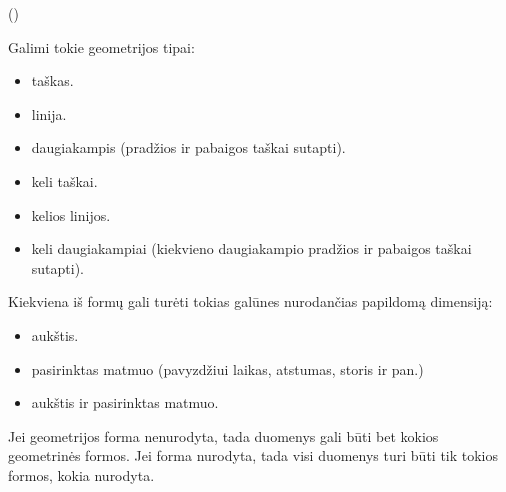 \documentclass[letterpaper,10pt,lithuanian]{sphinxmanual}
\begin{document}
\begin{fulllineitems}
\sphinxAtStartPar
{} ()

\sphinxAtStartPar
Galimi tokie geometrijos tipai:
\begin{itemize}
\item {} 
\sphinxAtStartPar
{} \sphinxhyphen{} taškas.

\item {} 
\sphinxAtStartPar
{} \sphinxhyphen{} linija.

\item {} 
\sphinxAtStartPar
{} \sphinxhyphen{} daugiakampis (pradžios ir pabaigos taškai  sutapti).

\item {} 
\sphinxAtStartPar
{} \sphinxhyphen{} keli taškai.

\item {} 
\sphinxAtStartPar
{} \sphinxhyphen{} kelios linijos.

\item {} 
\sphinxAtStartPar
{} \sphinxhyphen{} keli daugiakampiai (kiekvieno daugiakampio pradžios ir pabaigos taškai  sutapti).

\end{itemize}

\sphinxAtStartPar
Kiekviena iš formų gali turėti tokias galūnes nurodančias papildomą dimensiją:
\begin{itemize}
\item {} 
\sphinxAtStartPar
{} \sphinxhyphen{} aukštis.

\item {} 
\sphinxAtStartPar
{} \sphinxhyphen{} pasirinktas matmuo (pavyzdžiui laikas, atstumas, storis ir pan.)

\item {} 
\sphinxAtStartPar
{} \sphinxhyphen{} aukštis ir pasirinktas matmuo.

\end{itemize}

\sphinxAtStartPar
Jei geometrijos forma nenurodyta, tada duomenys gali būti bet kokios
geometrinės formos. Jei forma nurodyta, tada visi duomenys turi būti tik
tokios formos, kokia nurodyta.


\end{fulllineitems}
\end{document}
